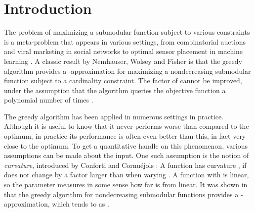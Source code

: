 \documentclass{article}
\theoremstyle{definition}
\begin{document}
\newcommand{\NOsubmod}{h}
\newcommand{\NOsubmodEst}{\tilde{\NOsubmod}}
\newcommand{\pot}{\psi}
\newcommand{\potEst}{\tilde{\pot}}
\newcommand{\sinit}{S_{0}}

\newcommand{\comp}[1]{\overline{#1}}
\newcommand{\compf}{\comp{f}}
\newcommand{\Mdual}{\M^{*}}
\newcommand{\Bdual}{\B^{*}}
\newcommand{\Odual}{O^{*}}
\newcommand{\Idual}{\I^{*}}
\newcommand{\Sdual}{S^{*}}
\newcommand{\fdual}{f^{*}}
\newcommand{\cinv}{(1 - c)^{-1}}
\newcommand{\NOLS}{\textsc{NOLS}}
\newcommand{\SubmodMax}{\textsc{SubmodMax}}
\newcommand{\SupmodMin}{\textsc{SupmodMin}}

\newcommand{\be}{\mathbf e}
\newcommand{\bc}{\mathbf c}
\newcommand{\bx}{\mathbf x}
\newcommand{\by}{\mathbf y}
\newcommand{\bv}{\mathbf v}
\newcommand{\proj}{\mathsf{proj}}
\newcommand{\dist}{\mathsf{dist}}
\newcommand{\spn}{\mathsf{span}}

\section{Introduction}
\label{sec:introduction}

The problem of maximizing a submodular function subject to various constraints is a meta-problem that appears in various settings, from combinatorial auctions \cite{LLN06,DNS05,Vondrak2008} and viral marketing in social networks \cite{KKT03} to optimal sensor placement in machine learning \cite{KGGK06,KSG08,KRGG09,KG11}. A classic result by Nemhauser, Wolsey and Fisher \cite{Nemhauser1978a} is that the greedy algorithm provides a -approximation for maximizing a nondecreasing submodular function subject to a cardinality constraint. The factor of  cannot be improved, under the assumption that the algorithm queries the objective function a polynomial number of times \cite{Nemhauser1978}. 

The greedy algorithm has been applied in numerous settings in practice. Although it is useful to know that it never performs worse than  compared to the optimum, in practice its performance is often even better than this, in fact very close to the optimum. To get a quantitative handle on this phenomenon, various assumptions can be made about the input. One such assumption is the notion of {\em curvature}, introduced by Conforti and Cornu\'ejols \cite{Conforti1984}: A function  has curvature , if  does not change by a factor larger than  when varying . A function with  is linear, so the parameter measures in some sense how far  is from linear. It was shown in \cite{Conforti1984} that the greedy algorithm for nondecreasing submodular functions provides a -approximation, which tends to  as .
\end{document}
